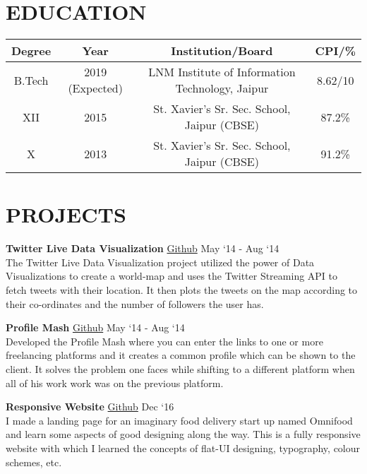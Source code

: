 \documentclass[margin]{res}
\begin{document}
\begin{resume}

\section{EDUCATION}

\begin{tabular}{|c|c|c|c|}

\hline
\textbf{Degree} & \textbf{Year} & {Institution/Board} & {CPI/\%} \\
\hline
B.Tech & 2019 (Expected) & LNM Institute of Information Technology, Jaipur & 8.62/10 \\
\hline
XII & 2015 & St. Xavier’s Sr. Sec. School, Jaipur (CBSE) & 87.2\% \\
\hline
X & 2013 & St. Xavier’s Sr. Sec. School, Jaipur (CBSE) & 91.2\% \\
\hline
\end{tabular}

\section{PROJECTS}

  {\textbf{Twitter Live Data Visualization}} \href{https://github.com/karanagarwal17/live-worldmap-visualization}{Github} \hfill May `14 - Aug `14\\
  The Twitter Live Data Visualization project utilized the power of Data Visualizations to create a world-map and uses the Twitter Streaming API to fetch tweets with their location.
  It then plots the tweets on the map according to their co-ordinates and the number of followers the user has.

  {\textbf{Profile Mash}} \href{https://github.com/karanagarwal17/profile-mash}{Github} \hfill May `14 - Aug `14\\
  Developed the Profile Mash where you can enter the links to one or more freelancing platforms and it creates a common profile which can be shown to the client. It solves the problem one faces while shifting to a different platform when all of his work work was on the previous platform.

  {\textbf{Responsive Website}} \href{https://github.com/karanagarwal17/responsive-web-project}{Github} \hfill Dec `16\\
  I made a landing page for an imaginary food delivery start up named Omnifood and learn some aspects of good designing along the way. This is a fully responsive website with which I learned the concepts of flat-UI designing, typography, colour schemes, etc.


\end{resume}
\end{document}
